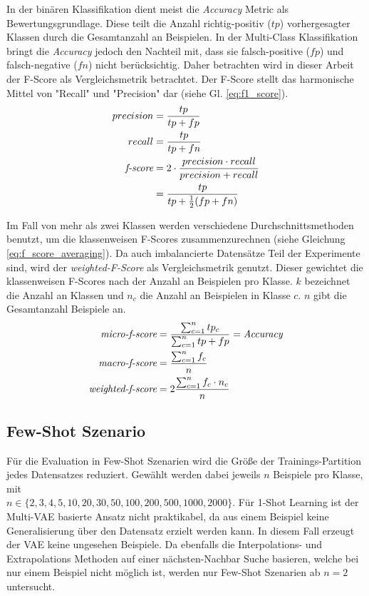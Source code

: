 In der binären Klassifikation dient meist die \textit{Accuracy} Metric als Bewertungsgrundlage. Diese teilt die Anzahl richtig-positiv ($tp$) vorhergesagter Klassen durch die Gesamtanzahl an Beispielen. In der Multi-Class Klassifikation bringt die \textit{Accuracy} jedoch den Nachteil mit, dass sie falsch-positive ($fp$) und falsch-negative ($fn$) nicht berücksichtig. Daher betrachten wird in dieser Arbeit der F-Score als Vergleichsmetrik betrachtet. Der F-Score stellt das harmonische Mittel von "Recall" und "Precision" dar (siehe Gl. \ref{eq:f1_score}).
\begin{align}\label{eq:f1_score}
  precision &= \frac{tp}{tp + fp} \notag\\
  recall &= \frac{tp}{tp + fn} \notag\\
  \textit{f-score} &= 2 \cdot \frac{precision \cdot recall}{precision + recall} \\
         &= \frac{tp}{tp + \frac{1}{2}(fp + fn)} \notag
\end{align}

Im Fall von mehr als zwei Klassen werden verschiedene Durchschnittsmethoden benutzt, um die klassenweisen F-Scores zusammenzurechnen (siehe Gleichung \ref{eq:f_score_averaging}). Da auch imbalancierte Datensätze Teil der Experimente sind, wird der \textit{weighted-F-Score} als Vergleichsmetrik genutzt. Dieser gewichtet die klassenweisen F-Scores nach der Anzahl an Beispielen pro Klasse. $k$ bezeichnet die Anzahl an Klassen und $n_c$ die Anzahl an Beispielen in Klasse $c$. $n$ gibt die Gesamtanzahl Beispiele an.
\begin{align} \label{eq:f_score_averaging}
  \textit{micro-f-score}    &= \frac{\sum_{c=1}^{n} tp_c}{\sum_{c=1}^{n} tp + fp} = \textit{Accuracy} \notag\\
  \textit{macro-f-score}    &= \frac{\sum_{c=1}^{n} f_c}{n} \notag\\
  \textit{weighted-f-score} &= 2 \frac{\sum_{c=1}^{n} f_c \cdot n_c}{n}
\end{align}


\subsection{Few-Shot Szenario}
Für die Evaluation in Few-Shot Szenarien wird die Größe der Trainings-Partition jedes Datensatzes reduziert. Gewählt werden dabei jeweils $n$ Beispiele pro Klasse, mit \\
$n \in \lbrace 2, 3, 4, 5, 10, 20, 30, 50, 100, 200, 500, 1000, 2000\rbrace$. Für 1-Shot Learning ist der Multi-VAE basierte Ansatz nicht praktikabel, da aus einem Beispiel keine Generalisierung über den Datensatz erzielt werden kann. In diesem Fall erzeugt der VAE keine ungesehen Beispiele. Da ebenfalls die Interpolations- und Extrapolations Methoden auf einer nächsten-Nachbar Suche basieren, welche bei nur einem Beispiel nicht möglich ist, werden nur Few-Shot Szenarien ab $n=2$ untersucht.



